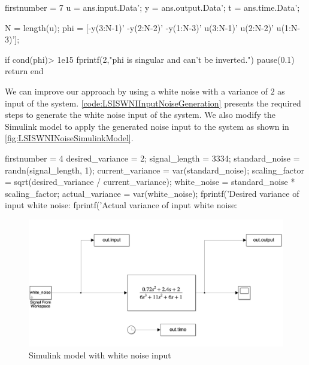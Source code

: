 \begin{code}
	\begin{matlabcode}{firstnumber = 7}
		u = ans.input.Data';
		y = ans.output.Data';
		t = ans.time.Data';
		
		N = length(u);
		phi = [-y(3:N-1)' -y(2:N-2)' -y(1:N-3)' u(3:N-1)' u(2:N-2)' u(1:N-3)'];
		
		if cond(phi)> 1e15
		fprintf(2,"phi is singular and can't be inverted.\n")
		pause(0.1)
		return
		end    
	\end{matlabcode}
	\label{code:LSISWNIStepResponse}
\end{code}

We can improve our approach by using a white noise with a variance of $2$ as input of the system. \autoref{code:LSISWNIInputNoiseGeneration} presents the required steps to generate the white noise input of the system.
We also modify the Simulink model to apply the generated noise input to the system as shown in \autoref{fig:LSISWNINoiseSimulinkModel}.

\begin{code}
	\begin{matlabcode}{firstnumber = 4}
		desired_variance = 2;
		signal_length = 3334; 
		standard_noise = randn(signal_length, 1);
		current_variance = var(standard_noise);
		scaling_factor = sqrt(desired_variance / current_variance);
		white_noise = standard_noise * scaling_factor;
		actual_variance = var(white_noise);
		fprintf('Desired variance of input white noise: %
		fprintf('Actual variance of input white noise: %
	\end{matlabcode}
	\label{code:LSISWNIInputNoiseGeneration}
\end{code}

\begin{figure}
	\centering
	\includegraphics[width=\textwidth]{images/LSISWNINoiseSimulinkModel.png}
	\caption{Simulink model with white noise input}
	\label{fig:LSISWNINoiseSimulinkModel}
\end{figure}

